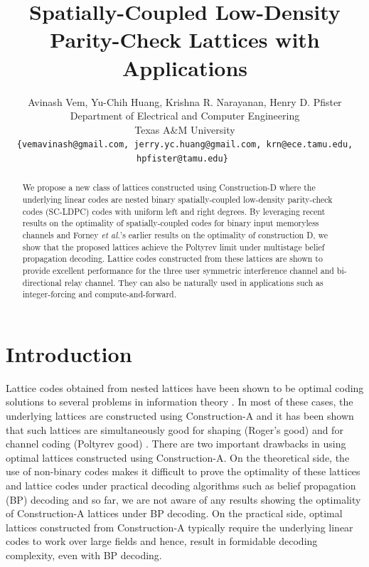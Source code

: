 \documentclass[journal,twocolumn]{IEEEtran}
\begin{document}
\title{Spatially-Coupled Low-Density Parity-Check Lattices with Applications}
\author{Avinash Vem, Yu-Chih Huang, Krishna R. Narayanan, Henry D. Pfister\\
Department of Electrical and Computer Engineering \\
Texas A\&M University\\
{\tt\small {\{vemavinash@gmail.com, jerry.yc.huang@gmail.com, krn@ece.tamu.edu, hpfister@tamu.edu\}} }}

\maketitle

\begin{abstract}
We propose a new class of lattices constructed using Construction-D where the underlying linear codes are nested binary spatially-coupled low-density parity-check codes (SC-LDPC) codes with uniform left and right degrees. By leveraging recent results on the optimality of spatially-coupled codes for binary input memoryless channels and Forney {\em et al.}'s earlier results on the optimality of construction D, we show that the proposed lattices achieve the Poltyrev limit under multistage belief propagation decoding. Lattice codes constructed from these lattices are shown to provide excellent performance for the three user symmetric interference channel and bi-directional relay channel. They can also be naturally used in applications such as integer-forcing and compute-and-forward.
\end{abstract}


\section{Introduction}
Lattice codes obtained from nested lattices have been shown to be optimal coding solutions to several problems in information theory \cite{erez05}. In most of these cases, the underlying lattices are constructed using Construction-A and it has been shown that such lattices are simultaneously good for shaping (Roger's good) and for channel coding (Poltyrev good) \cite{erez05}. There are two important drawbacks in using optimal lattices constructed using Construction-A. On the theoretical side, the use of non-binary codes makes it difficult to prove the optimality of these lattices and lattice codes under practical decoding algorithms such as belief propagation (BP) decoding and so far, we are not aware of any results showing the optimality of Construction-A lattices under BP decoding. On the practical side, optimal lattices constructed from Construction-A typically require the underlying linear codes to work over large fields and hence, result in formidable decoding complexity, even with BP decoding.
\end{document}
